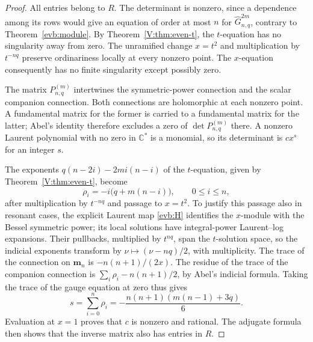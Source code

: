\documentclass[11pt,a4paper]{article}
\theoremstyle{definition}
\theoremstyle{remark}
\numberwithin{equation}{section}
\begin{document}
\begin{proof}
All entries belong to $R$. The determinant is nonzero, since a
dependence among its rows would give an equation of order at most
$n$ for $\widehat G^{2m}_{n,q}$, contrary to Theorem~\ref{evb:module}.
By Theorem~\ref{V:thm:even-t}, the $t$-equation has no singularity
away from zero. The unramified change $x=t^2$ and multiplication by
$t^{-nq}$ preserve ordinariness locally at every nonzero point.
The $x$-equation consequently has no finite singularity except
possibly zero.

The matrix $P^{(m)}_{n,q}$ intertwines the symmetric-power
connection and the scalar companion connection. Both connections
are holomorphic at each nonzero point. A fundamental matrix for
the former is carried to a fundamental matrix for the latter;
Abel's identity therefore excludes a zero of $\det P^{(m)}_{n,q}$
there. A nonzero Laurent polynomial with no zero in $\mathbb C^*$
is a monomial, so its determinant is $cx^s$ for an integer $s$.

The exponents $q(n-2i)-2mi(n-i)$ of the $t$-equation, given by
Theorem~\ref{V:thm:even-t}, become
\[
 \rho_i=-i\bigl(q+m(n-i)\bigr),\qquad 0\le i\le n,
\]
after multiplication by $t^{-nq}$ and passage to $x=t^2$.
To justify this passage also in resonant cases, the explicit
Laurent map \eqref{evb:H} identifies the $x$-module with the
Bessel symmetric power; its local solutions have integral-power
Laurent--log expansions. Their pullbacks, multiplied by $t^{nq}$,
span the $t$-solution space, so the indicial exponents transform
by $\nu\mapsto(\nu-nq)/2$, with multiplicity.
The trace of the connection on $\mathbf m_n$ is
$-n(n+1)/(2x)$. The residue of the trace of the companion
connection is $\sum_i\rho_i-n(n+1)/2$, by Abel's indicial formula.
Taking the trace of the gauge equation at zero thus gives
\[
 s=\sum_{i=0}^n\rho_i
   =-\frac{n(n+1)(m(n-1)+3q)}6.
\]
Evaluation at $x=1$ proves that $c$ is nonzero and rational.
The adjugate formula then shows that the inverse matrix also has
entries in $R$.
\end{proof}
\end{document}
